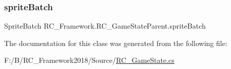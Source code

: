 \subsubsection{\texorpdfstring{sprite\+Batch}{spriteBatch}}
{\footnotesize\ttfamily Sprite\+Batch R\+C\+\_\+\+Framework.\+R\+C\+\_\+\+Game\+State\+Parent.\+sprite\+Batch\hspace{0.3cm}{\ttfamily [static]}}



The documentation for this class was generated from the following file\+:\begin{DoxyCompactItemize}
\item 
F\+:/\+B/\+R\+C\+\_\+\+Framework2018/\+Source/\mbox{\hyperlink{_r_c___game_state_8cs}{R\+C\+\_\+\+Game\+State.\+cs}}\end{DoxyCompactItemize}
